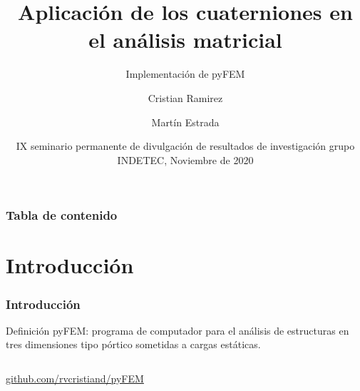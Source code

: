 \documentclass{beamer}
\title[Cuaterniones en pyFEM] %
{Aplicación de los cuaterniones en el análisis matricial}
\subtitle{Implementación de pyFEM}
\author[Ramirez, Estrada] %
{Cristian Ramirez \and Martín Estrada}
\institute[UNAL] %
{
  Facultad de ingeniería\\
  Universidad Nacional de Colombia
}
\date[INDETEC 2020] %
{IX seminario permanente de divulgación de resultados de investigación grupo INDETEC, Noviembre de 2020}
\begin{document}
\begin{frame}
  \titlepage
\end{frame}

\begin{frame}
  \frametitle{Tabla de contenido}
  \tableofcontents
\end{frame}

\section{Introducción}
\begin{frame}
  \frametitle{Introducción}
  \begin{block}{Definición}
    pyFEM: programa de computador para el análisis de estructuras en tres dimensiones tipo pórtico sometidas a cargas estáticas.    
  \end{block}

  \begin{columns}
    \href{https://github.com/rvcristiand/pyFEM}{github.com/rvcristiand/pyFEM}
  \end{columns}
\end{frame}
\end{document}
